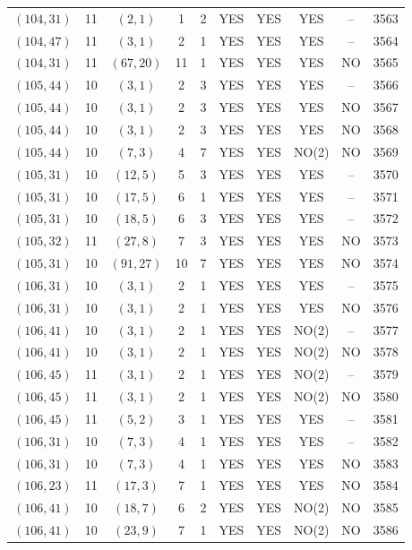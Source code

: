 \begin{longtable}{|c|c|c|c|c|c|c|c|c|c|}
$(104, 31)$ & 11 & $(2, 1)$ & 1 & 2 & YES & YES & YES & -- & 3563\\
$(104, 47)$ & 11 & $(3, 1)$ & 2 & 1 & YES & YES & YES & -- & 3564\\
$(104, 31)$ & 11 & $(67, 20)$ & 11 & 1 & YES & YES & YES & NO & 3565\\
$(105, 44)$ & 10 & $(3, 1)$ & 2 & 3 & YES & YES & YES & -- & 3566\\
$(105, 44)$ & 10 & $(3, 1)$ & 2 & 3 & YES & YES & YES & NO & 3567\\
$(105, 44)$ & 10 & $(3, 1)$ & 2 & 3 & YES & YES & YES & NO & 3568\\
$(105, 44)$ & 10 & $(7, 3)$ & 4 & 7 & YES & YES & NO(2) & NO & 3569\\
$(105, 31)$ & 10 & $(12, 5)$ & 5 & 3 & YES & YES & YES & -- & 3570\\
$(105, 31)$ & 10 & $(17, 5)$ & 6 & 1 & YES & YES & YES & -- & 3571\\
$(105, 31)$ & 10 & $(18, 5)$ & 6 & 3 & YES & YES & YES & -- & 3572\\
$(105, 32)$ & 11 & $(27, 8)$ & 7 & 3 & YES & YES & YES & NO & 3573\\
$(105, 31)$ & 10 & $(91, 27)$ & 10 & 7 & YES & YES & YES & NO & 3574\\
$(106, 31)$ & 10 & $(3, 1)$ & 2 & 1 & YES & YES & YES & -- & 3575\\
$(106, 31)$ & 10 & $(3, 1)$ & 2 & 1 & YES & YES & YES & NO & 3576\\
$(106, 41)$ & 10 & $(3, 1)$ & 2 & 1 & YES & YES & NO(2) & -- & 3577\\
$(106, 41)$ & 10 & $(3, 1)$ & 2 & 1 & YES & YES & NO(2) & NO & 3578\\
$(106, 45)$ & 11 & $(3, 1)$ & 2 & 1 & YES & YES & NO(2) & -- & 3579\\
$(106, 45)$ & 11 & $(3, 1)$ & 2 & 1 & YES & YES & NO(2) & NO & 3580\\
$(106, 45)$ & 11 & $(5, 2)$ & 3 & 1 & YES & YES & YES & -- & 3581\\
$(106, 31)$ & 10 & $(7, 3)$ & 4 & 1 & YES & YES & YES & -- & 3582\\
$(106, 31)$ & 10 & $(7, 3)$ & 4 & 1 & YES & YES & YES & NO & 3583\\
$(106, 23)$ & 11 & $(17, 3)$ & 7 & 1 & YES & YES & YES & NO & 3584\\
$(106, 41)$ & 10 & $(18, 7)$ & 6 & 2 & YES & YES & NO(2) & NO & 3585\\
$(106, 41)$ & 10 & $(23, 9)$ & 7 & 1 & YES & YES & NO(2) & NO & 3586\\

\end{longtable}
